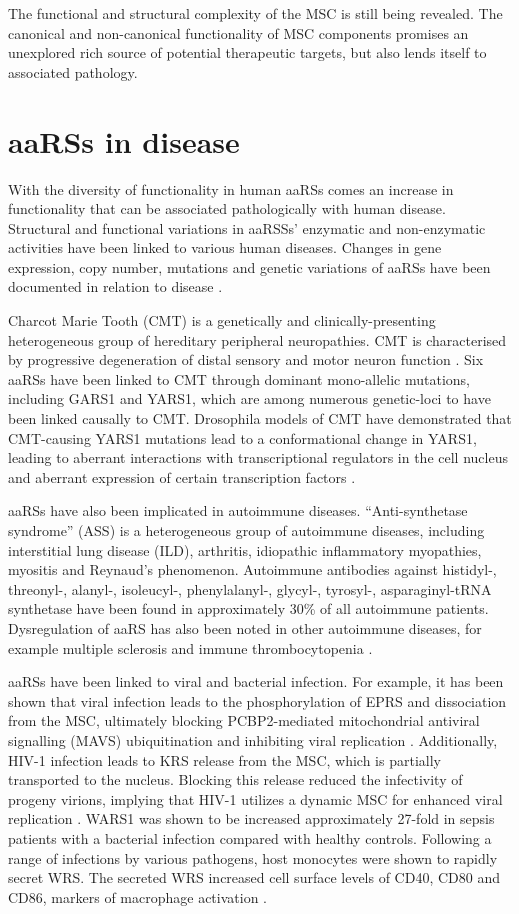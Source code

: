 The functional and structural complexity of the MSC is still being revealed.
The canonical and non-canonical functionality of MSC components promises an unexplored rich source of potential therapeutic targets, but also lends itself to associated pathology.

\section{aaRSs in disease}
With the diversity of functionality in human aaRSs comes an increase in functionality that can be associated pathologically with human disease.
Structural and functional variations in aaRSSs' enzymatic and non-enzymatic activities have been linked to various human diseases.
Changes in gene expression, copy number, mutations and genetic variations of aaRSs have been documented in relation to disease \cite{kwon2019aminoacyl}.

Charcot Marie Tooth (CMT) is a genetically and clinically-presenting heterogeneous group of hereditary peripheral neuropathies.
CMT is characterised by progressive degeneration of distal sensory and motor neuron function \cite{yao2013aminoacyl}.
Six aaRSs have been linked to CMT through dominant mono-allelic mutations, including GARS1 and YARS1, which are among numerous genetic-loci to have been linked causally to CMT.
Drosophila models of CMT have demonstrated that CMT-causing YARS1 mutations lead to a conformational change in YARS1, leading to aberrant interactions with transcriptional regulators in the cell nucleus and aberrant expression of certain transcription factors \cite{bervoets2019transcriptional}.

aaRSs have also been implicated in autoimmune diseases.
``Anti-synthetase syndrome'' (ASS) is a heterogeneous group of autoimmune diseases, including interstitial lung disease (ILD), arthritis, idiopathic inflammatory myopathies, myositis and Reynaud's phenomenon.
Autoimmune antibodies against histidyl-, threonyl-, alanyl-, isoleucyl-, phenylalanyl-, glycyl-, tyrosyl-, asparaginyl-tRNA synthetase have been found in approximately 30\% of all autoimmune patients.
Dysregulation of aaRS has also been noted in other autoimmune diseases, for example multiple sclerosis and immune thrombocytopenia \cite{nie2019roles}.

aaRSs have been linked to viral and bacterial infection.
For example, it has been shown that viral infection leads to the phosphorylation of EPRS and dissociation from the MSC, ultimately blocking PCBP2-mediated mitochondrial antiviral signalling (MAVS) ubiquitination and inhibiting viral replication \cite{lee2016infection}.
Additionally, HIV-1 infection leads to KRS release from the MSC, which is partially transported to the nucleus.
Blocking this release reduced the infectivity of progeny virions, implying that HIV-1 utilizes a dynamic MSC for enhanced viral replication \cite{duchon2017hiv}.
WARS1 was shown to be increased approximately 27-fold in sepsis patients with a bacterial infection compared with healthy controls. Following a range of infections by various pathogens, host monocytes were shown to rapidly secret WRS.
The secreted WRS increased cell surface levels of CD40, CD80 and CD86, markers of macrophage activation \cite{ahn2016secreted}.

